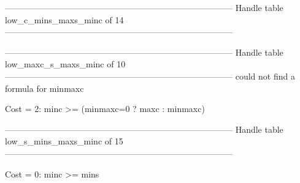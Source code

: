 --------------------------------------------------------------------------------
Handle table low_c_mins_maxs_minc of 14
--------------------------------------------------------------------------------


--------------------------------------------------------------------------------
Handle table low_maxc_s_maxs_minc of 10
--------------------------------------------------------------------------------
could not find a formula for minmaxc

Cost =  2:  minc >= (minmaxc=0 ? maxc : minmaxc)

--------------------------------------------------------------------------------
Handle table low_s_mins_maxs_minc of 15
--------------------------------------------------------------------------------

Cost =  0:  minc >= mins

